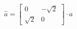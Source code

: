 \documentclass[preview]{standalone}
\begin{document}
\begin{align*}
\hat{a} = \begin{bmatrix} 0 & -\sqrt{2}  \\ \sqrt{2} & 0\end{bmatrix} \cdot a
\end{align*}
\end{document}
